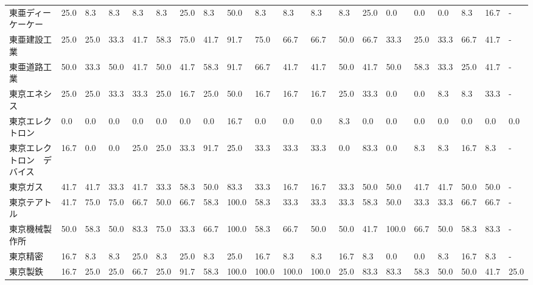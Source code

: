 \begin{tabular}{llllllllllllllllllll}
東亜ディーケーケー       &   25.0 &    8.3 &       8.3 &       8.3 &        8.3 &   25.0 &    8.3 &   50.0 &     8.3 &     8.3 &    8.3 &   8.3 &   25.0 &     0.0 &     0.0 &   0.0 &   8.3 &  16.7 &     - \\
東亜建設工業          &   25.0 &   25.0 &      33.3 &      41.7 &       58.3 &   75.0 &   41.7 &   91.7 &    75.0 &    66.7 &   66.7 &  50.0 &   66.7 &    33.3 &    25.0 &  33.3 &  66.7 &  41.7 &     - \\
東亜道路工業          &   50.0 &   33.3 &      50.0 &      41.7 &       50.0 &   41.7 &   58.3 &   91.7 &    66.7 &    41.7 &   41.7 &  50.0 &   41.7 &    50.0 &    58.3 &  33.3 &  25.0 &  41.7 &     - \\
東京エネシス          &   25.0 &   25.0 &      33.3 &      33.3 &       25.0 &   16.7 &   25.0 &   50.0 &    16.7 &    16.7 &   16.7 &  25.0 &   33.3 &     0.0 &     0.0 &   8.3 &   8.3 &  33.3 &     - \\
東京エレクトロン        &    0.0 &    0.0 &       0.0 &       0.0 &        0.0 &    0.0 &    0.0 &   16.7 &     0.0 &     0.0 &    0.0 &   8.3 &    0.0 &     0.0 &     0.0 &   0.0 &   0.0 &   0.0 &   0.0 \\
東京エレクトロン　デバイス   &   16.7 &    0.0 &       0.0 &      25.0 &       25.0 &   33.3 &   91.7 &   25.0 &    33.3 &    33.3 &   33.3 &   0.0 &   83.3 &     0.0 &     8.3 &   8.3 &  16.7 &   8.3 &     - \\
東京ガス            &   41.7 &   41.7 &      33.3 &      41.7 &       33.3 &   58.3 &   50.0 &   83.3 &    33.3 &    16.7 &   16.7 &  33.3 &   50.0 &    50.0 &    41.7 &  41.7 &  50.0 &  50.0 &     - \\
東京テアトル          &   41.7 &   75.0 &      75.0 &      66.7 &       50.0 &   66.7 &   58.3 &  100.0 &    58.3 &    33.3 &   33.3 &  33.3 &   58.3 &    50.0 &    33.3 &  33.3 &  66.7 &  66.7 &     - \\
東京機械製作所         &   50.0 &   58.3 &      50.0 &      83.3 &       75.0 &   33.3 &   66.7 &  100.0 &    58.3 &    66.7 &   50.0 &  50.0 &   41.7 &   100.0 &    66.7 &  50.0 &  58.3 &  83.3 &     - \\
東京精密            &   16.7 &    8.3 &       8.3 &      25.0 &        8.3 &   25.0 &    8.3 &   25.0 &    16.7 &     8.3 &    8.3 &  16.7 &    8.3 &     0.0 &     0.0 &   8.3 &  16.7 &   8.3 &     - \\
東京製鉄            &   16.7 &   25.0 &      25.0 &      66.7 &       25.0 &   91.7 &   58.3 &  100.0 &   100.0 &   100.0 &  100.0 &  25.0 &   83.3 &    83.3 &    58.3 &  50.0 &  50.0 &  41.7 &  25.0 \\

\end{tabular}
